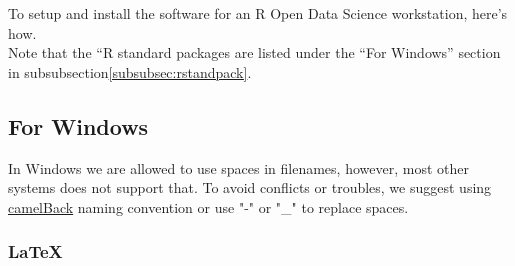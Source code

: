 \documentclass[10pt]{article} %
\begin{document}
To setup and install the software for an R Open Data Science workstation, here's how. \\

Note that the ``R standard packages are listed under the ``For Windows'' section in subsubsection\ref{subsubsec:rstandpack}.  \\

\subsection{For Windows}

In Windows we are allowed to use spaces in filenames, however, most other systems does not support that.
To avoid conflicts or troubles, we suggest using \href{https://sanaulla.info/2008/06/25/camelcase-notation-naming-convention-for-programming-languages/}{camelBack} naming convention or use "-" or "\_" to replace spaces.

\subsubsection{LaTeX}
\end{document}
